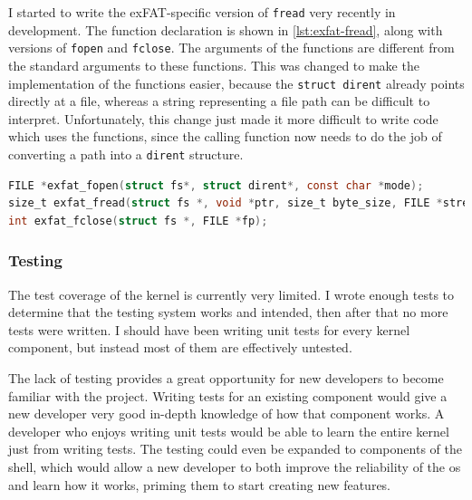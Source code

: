 \documentclass{article}
\begin{document}
I started to write the exFAT-specific version of \texttt{fread} very recently
in development. The function declaration is shown in \autoref{lst:exfat-fread},
along with versions of \texttt{fopen} and \texttt{fclose}. The arguments of the
functions are different from the standard arguments to these functions. This
was changed to make the implementation of the functions easier, because the
\verb!struct dirent! already points directly at a file, whereas a string
representing a file path can be difficult to interpret. Unfortunately, this
change just made it more difficult to write code which uses the functions,
since the calling function now needs to do the job of converting a path into a
\verb!dirent! structure.

\begin{lstlisting}[language=C, caption={Function declarations of the exFAT
                   versions of \texttt{fopen}, \texttt{fread}, and
                   \texttt{fclose}.}, float, label={lst:exfat-fread}]
FILE *exfat_fopen(struct fs*, struct dirent*, const char *mode);
size_t exfat_fread(struct fs *, void *ptr, size_t byte_size, FILE *stream);
int exfat_fclose(struct fs *, FILE *fp);
\end{lstlisting}

\subsubsection{Testing}
The test coverage of the kernel is currently very limited. I wrote enough tests
to determine that the testing system works and intended, then after that no
more tests were written. I should have been writing unit tests for every kernel
component, but instead most of them are effectively untested.

The lack of testing provides a great opportunity for new developers to become
familiar with the project. Writing tests for an existing component would give a
new developer very good in-depth knowledge of how that component works. A
developer who enjoys writing unit tests would be able to learn the entire
kernel just from writing tests. The testing could even be expanded to
components of the shell, which would allow a new developer to both improve the
reliability of the \gls{os} and learn how it works, priming them to start
creating new features.
\end{document}

